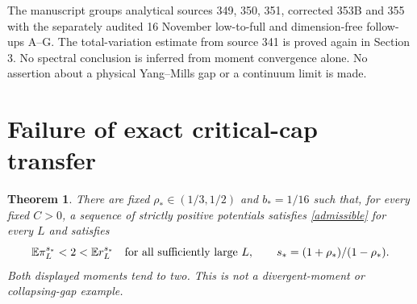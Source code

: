 \documentclass[11pt]{article}
\newcommand{\E}{\mathbb E}
\newtheorem{theorem}{Theorem}[section]
\begin{document}
The manuscript groups analytical sources 349, 350, 351, corrected 353B and 355 with the separately audited 16 November low-to-full and dimension-free follow-ups A--G. The total-variation estimate from source 341 is proved again in Section 3. No spectral conclusion is inferred from moment convergence alone. No assertion about a physical Yang--Mills gap or a continuum limit is made.

\section{Failure of exact critical-cap transfer}
\begin{theorem}\label{capfailure}
There are fixed $\rho_*\in(1/3,1/2)$ and $b_*=1/16$ such that, for every fixed $C>0$, a sequence of strictly positive potentials satisfies \eqref{admissible} for every $L$ and satisfies
\[
 \E\pi_L^{s_*}<2<\E r_L^{s_*}
 \quad\hbox{for all sufficiently large }L,
 \qquad s_*=(1+\rho_*)/(1-\rho_*).
\]
Both displayed moments tend to two. This is not a divergent-moment or collapsing-gap example.
\end{theorem}
\end{document}
